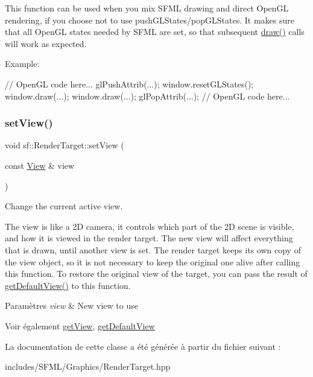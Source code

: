 This function can be used when you mix S\+F\+ML drawing and direct Open\+GL rendering, if you choose not to use push\+G\+L\+States/pop\+G\+L\+States. It makes sure that all Open\+GL states needed by S\+F\+ML are set, so that subsequent \hyperlink{classsf_1_1RenderTarget_a12417a3bcc245c41d957b29583556f39}{draw()} calls will work as expected.

Example\+: 
\begin{DoxyCode}
\textcolor{comment}{// OpenGL code here...}
glPushAttrib(...);
window.resetGLStates();
window.draw(...);
window.draw(...);
glPopAttrib(...);
\textcolor{comment}{// OpenGL code here...}
\end{DoxyCode}
 \mbox{\label{classsf_1_1RenderTarget_a063db6dd0a14913504af30e50cb6d946}} 
\subsubsection{\texorpdfstring{set\+View()}{setView()}}
{\footnotesize\ttfamily void sf\+::\+Render\+Target\+::set\+View (\begin{DoxyParamCaption}\item[{const \hyperlink{classsf_1_1View}{View} \&}]{view }\end{DoxyParamCaption})}



Change the current active view. 

The view is like a 2D camera, it controls which part of the 2D scene is visible, and how it is viewed in the render target. The new view will affect everything that is drawn, until another view is set. The render target keeps its own copy of the view object, so it is not necessary to keep the original one alive after calling this function. To restore the original view of the target, you can pass the result of \hyperlink{classsf_1_1RenderTarget_ad3b533c3f899d7044d981ed607aef9be}{get\+Default\+View()} to this function.


\begin{DoxyParams}{Paramètres}
{\em view} & New view to use\\
\hline
\end{DoxyParams}
\begin{DoxySeeAlso}{Voir également}
\hyperlink{classsf_1_1RenderTarget_a2c179503b4dcdf5282ef6426d317602c}{get\+View}, \hyperlink{classsf_1_1RenderTarget_ad3b533c3f899d7044d981ed607aef9be}{get\+Default\+View} 
\end{DoxySeeAlso}


La documentation de cette classe a été générée à partir du fichier suivant \+:\begin{DoxyCompactItemize}
\item 
includes/\+S\+F\+M\+L/\+Graphics/Render\+Target.\+hpp\end{DoxyCompactItemize}

